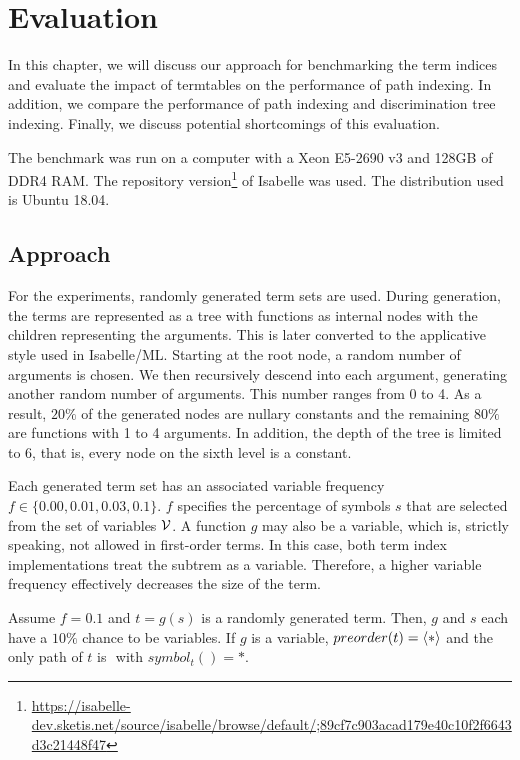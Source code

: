 \chapter{Evaluation} \label{evaluation}

In this chapter, we will discuss our approach for benchmarking the term indices and evaluate the impact of termtables on the performance of path indexing. In addition, we compare the performance of path indexing and discrimination tree indexing. Finally, we discuss potential shortcomings of this evaluation.

The benchmark was run on a computer with a Xeon E5-2690 v3 and 128GB of DDR4 RAM. The repository version\footnote{\url{https://isabelle-dev.sketis.net/source/isabelle/browse/default/;89cf7c903acad179e40c10f2f6643d3c21448f47}} of Isabelle was used. The distribution used is Ubuntu 18.04.

\section{Approach} \label{approach}
For the experiments, randomly generated term sets are used. During generation, the terms are represented as a tree with functions as internal nodes with the children representing the arguments. This is later converted to the applicative style used in Isabelle/ML.
Starting at the root node, a random number of arguments is chosen. We then recursively descend into each argument, generating another random number of arguments. This number ranges from 0 to 4. As a result, $20\%$ of the generated nodes are nullary constants and the remaining $80\%$ are functions with 1 to 4 arguments. In addition, the depth of the tree is limited to 6, that is, every node on the sixth level is a constant.

Each generated term set has an associated variable frequency $f \in \{0.00, 0.01, 0.03, 0.1\}$. $f$ specifies the percentage of symbols $s$ that are selected from the set of variables $\mathcal{V}$. A function $g$ may also be a variable, which is, strictly speaking, not allowed in first-order terms. In this case, both term index implementations treat the subtrem as a variable. Therefore, a higher variable frequency effectively decreases the size of the term.

\begin{exmpl}
  Assume $f = 0.1$ and $t = g(s)$ is a randomly generated term. Then, $g$ and $s$ each have a $10\%$ chance to be variables. If $g$ is a variable, $preorder(t) = \langle * \rangle$ and the only path of $t$ is $\ang{}$ with $symbol_{t}(\ang{}) = *$.
\end{exmpl}

